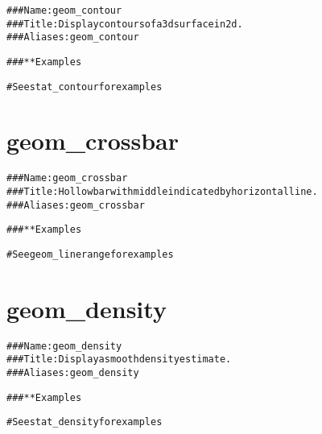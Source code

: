 \documentclass[a4paper,titlepage]{tufte-handout}\usepackage{graphicx, color}
\makeatletter
\newcommand{\hlcomment}[1]{\textcolor[rgb]{0.180392156862745,0.6,0.341176470588235}{#1}}%
\newenvironment{kframe}{%
 \def\at@end@of@kframe{}%
 \ifinner\ifhmode%
  \def\at@end@of@kframe{\end{minipage}}%
  \begin{minipage}{\columnwidth}%
 \fi\fi%
 \def\FrameCommand##1{\hskip\@totalleftmargin \hskip-\fboxsep
 \colorbox{shadecolor}{##1}\hskip-\fboxsep
     \hskip-\linewidth \hskip-\@totalleftmargin \hskip\columnwidth}%
 \MakeFramed {\advance\hsize-\width
   \@totalleftmargin\z@ \linewidth\hsize
   \@setminipage}}%
 {\par\unskip\endMakeFramed%
 \at@end@of@kframe}
\newenvironment{knitrout}{}{} %
\makeatother
\begin{document}
\begin{knitrout}
\color{fgcolor}\begin{kframe}
\begin{alltt}
\hlcomment{### Name: geom_contour}
\hlcomment{### Title: Display contours of a 3d surface in 2d.}
\hlcomment{### Aliases: geom_contour}

\hlcomment{### ** Examples}

\hlcomment{# See stat_contour for examples}



\end{alltt}
\end{kframe}
\end{knitrout}



\section{geom\_crossbar}

\begin{knitrout}
\color{fgcolor}\begin{kframe}
\begin{alltt}
\hlcomment{### Name: geom_crossbar}
\hlcomment{### Title: Hollow bar with middle indicated by horizontal line.}
\hlcomment{### Aliases: geom_crossbar}

\hlcomment{### ** Examples}

\hlcomment{# See geom_linerange for examples}



\end{alltt}
\end{kframe}
\end{knitrout}



\section{geom\_density}

\begin{knitrout}
\color{fgcolor}\begin{kframe}
\begin{alltt}
\hlcomment{### Name: geom_density}
\hlcomment{### Title: Display a smooth density estimate.}
\hlcomment{### Aliases: geom_density}

\hlcomment{### ** Examples}

\hlcomment{# See stat_density for examples}



\end{alltt}
\end{kframe}
\end{knitrout}
\end{document}
